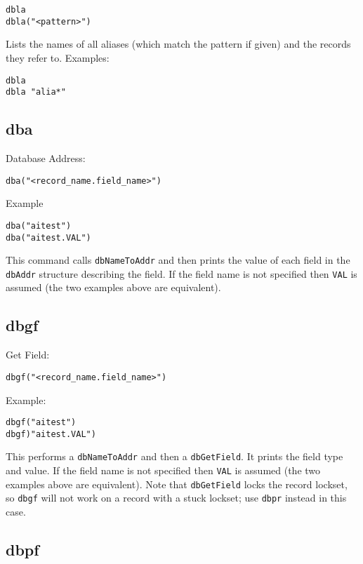 \begin{verbatim}
dbla
dbla("<pattern>")
\end{verbatim}

Lists the names of all aliases (which match the pattern if given) and the records they refer to. Examples:

\begin{verbatim}
dbla
dbla "alia*"
\end{verbatim}

\subsection{dba}

Database Address:

\begin{verbatim}
dba("<record_name.field_name>")
\end{verbatim}

Example

\begin{verbatim}
dba("aitest")
dba("aitest.VAL")
\end{verbatim}

This command calls \verb|dbNameToAddr| and then prints the value of each field in the \verb|dbAddr| structure describing the field. 
If the field name is not specified then \verb|VAL| is assumed (the two examples above are equivalent).

\subsection{dbgf}

Get Field:

\begin{verbatim}
dbgf("<record_name.field_name>")
\end{verbatim}

Example:

\begin{verbatim}
dbgf("aitest")
dbgf)"aitest.VAL")
\end{verbatim}

This performs a \verb|dbNameToAddr| and then a \verb|dbGetField|. It prints the field type and value. If the field name is not 
specified then \verb|VAL| is assumed (the two examples above are equivalent). Note that \verb|dbGetField| locks the record lockset, 
so \verb|dbgf| will not work on a record with a stuck lockset; use \verb|dbpr| instead in this case.

\subsection{dbpf}

